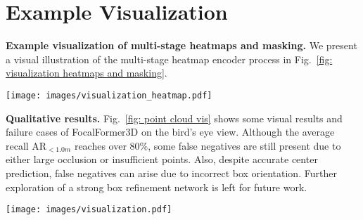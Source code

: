 \documentclass[10pt,twocolumn,letterpaper]{article}
\begin{document}
\section{Example Visualization}
\label{sec: visualization}

\vspace{2mm}
\noindent\textbf{Example visualization of multi-stage heatmaps and masking.}
We present a visual illustration of the multi-stage heatmap encoder process in Fig.~\ref{fig: visualization heatmaps and masking}. 


\begin{figure*}[t]
	\begin{center}
		\texttt{[image: images/visualization\_heatmap.pdf]}
	\end{center}
	\caption{\textbf{Example visualization of multi-stage heatmap encoder process on the bird's eye view}. The process of identifying false negatives operates stage by stage. We show different categories with different colors for visualization. The top three subfigures display the ground-truth center heatmaps at each stage, highlighting the missed object detections. The two subfigures below display the positive mask that shows positive object predictions. The scene ids are ''4de831d46edf46d084ac2cecf682b11a'' and ''825a9083e9fc466ca6fdb4bb75a95449'' from the nuScenes \textit{val} set. We recommend zooming in on the figure for best viewing.}
	\label{fig: visualization heatmaps and masking}
\end{figure*}

\vspace{2mm}
\noindent\textbf{Qualitative results.}
Fig.~\ref{fig: point cloud vis} shows some visual results and failure cases of FocalFormer3D on the bird's eye view. Although the average recall AR$_{<1.0m}$ reaches over $80$\%, some false negatives are still present due to either large occlusion or insufficient points. Also, despite accurate center prediction, false negatives can arise due to incorrect box orientation. Further exploration of a strong box refinement network is left for future work.

\begin{figure*}[t]
	\begin{center}
		\texttt{[image: images/visualization.pdf]}
	\end{center}
	\caption{\textbf{Visual results and failure cases.} The green boxes represent the ground truth objects and the blue ones stand for our predictions. We recommend zooming in on the figure for best viewing.}
	\label{fig: point cloud vis}
\end{figure*}
\end{document}
